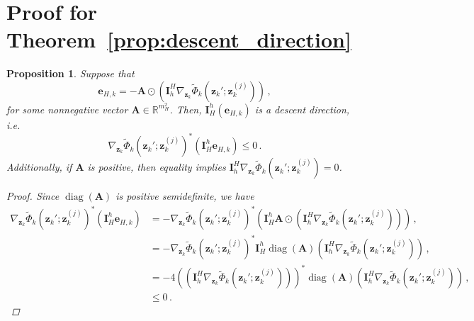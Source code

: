 \documentclass{article}
\numberwithin{equation}{section}
\newtheorem{proposition}[theorem]{Proposition}
\begin{document}
\section{Proof for Theorem~\ref{prop:descent_direction}}\label{app:proof_descent_direction}
\begin{proposition}\label{prop:multigrid_convergence}
Suppose that 
\begin{equation*}
    \bm{e}_{H,k} = -\bm{A}\odot\left(\bm{I}_h^H\nabla_{\bm{z}_k} \widetilde{\Phi}_k\left(\bm{z}_k'; \bm{z}_k^{(j)}\right)\right)\,,
\end{equation*} 
for some nonnegative vector $\bm{A}\in\mathbb{R}^{m_H^2}$. Then, $\bm{I}_H^h\left(\bm{e}_{H,k}\right)$ is a descent direction, i.e.
\begin{equation*}                
    \nabla_{\bm{z}_k} \widetilde{\Phi}_k\left(\bm{z}_k'; \bm{z}_k^{(j)}\right)^*\left(\bm{I}_H^h\bm{e}_{H,k}\right)\leq0\,.
\end{equation*}
    Additionally, if $\bm{A}$ is positive, then equality implies $\bm{I}_h^H\nabla_{\bm{z}_k} \widetilde{\Phi}_k\left(\bm{z}_k'; \bm{z}_k^{(j)}\right)=0$.
\begin{proof}
Since $\operatorname{diag}(\bm{A})$ is positive semidefinite, we have
\begin{equation*}
\begin{aligned}
    \nabla_{\bm{z}_k} \widetilde{\Phi}_k\left(\bm{z}_k'; \bm{z}_k^{(j)}\right)^*\left(\bm{I}_H^h\bm{e}_{H,k}\right) &= -\nabla_{\bm{z}_k} \widetilde{\Phi}_k\left(\bm{z}_k'; \bm{z}_k^{(j)}\right)^*\left(\bm{I}_H^h\bm{A}\odot\left(\bm{I}_h^H\nabla_{\bm{z}_k} \widetilde{\Phi}_k\left(\bm{z}_k'; \bm{z}_k^{(j)}\right)\right)\right)\,,\\
    &= -\nabla_{\bm{z}_k} \widetilde{\Phi}_k\left(\bm{z}_k'; \bm{z}_k^{(j)}\right)^*\bm{I}_H^h\operatorname{diag}(\bm{A})\left(\bm{I}_h^H\nabla_{\bm{z}_k} \widetilde{\Phi}_k\left(\bm{z}_k'; \bm{z}_k^{(j)}\right)\right) \,,\\
    &=-4\left(\left(\bm{I}_h^H\nabla_{\bm{z}_k} \widetilde{\Phi}_k\left(\bm{z}_k'; \bm{z}_k^{(j)}\right)\right)\right)^*\operatorname{diag}(\bm{A})\left(\bm{I}_h^H\nabla_{\bm{z}_k} \widetilde{\Phi}_k\left(\bm{z}_k'; \bm{z}_k^{(j)}\right)\right) \,,\\
    &\leq 0\,.
\end{aligned}
\end{equation*}

\end{proof}
\end{proposition}
\end{document}
